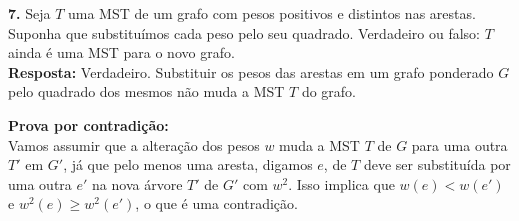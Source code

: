 
\noindent\textbf{7.} Seja $T$ uma MST de um grafo com pesos positivos e distintos nas arestas. Suponha que substituímos cada peso pelo seu quadrado. Verdadeiro ou falso: $T$ ainda é uma MST para o novo grafo.\\[6pt]
\textbf{Resposta:} Verdadeiro. Substituir os pesos das arestas em um grafo ponderado $G$ pelo quadrado dos mesmos não muda a MST $T$ do grafo.

\textbf{Prova por contradição:}\\
Vamos assumir que a alteração dos pesos $w$ muda a MST $T$ de $G$ para uma outra $T'$ em $G'$, já que pelo menos uma aresta, digamos $e$, de $T$ deve ser substituída por uma outra $e'$ na nova árvore $T'$ de $G'$ com $w^2$. Isso implica que $w(e) < w(e')$ e $w^2(e) \geq w^2(e')$, o que é uma contradição.\\[6pt]